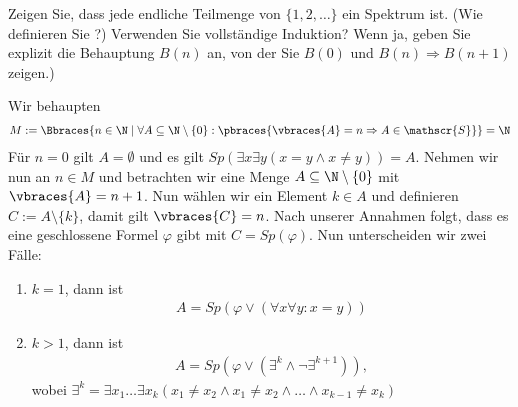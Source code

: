 
\begin{exercise}[71]

\phantom{}
	Zeigen Sie, dass jede endliche Teilmenge von  $\{1,2, \dots \}$ ein Spektrum ist. (Wie definieren Sie ?) Verwenden Sie vollständige Induktion? Wenn ja, geben Sie explizit die Behauptung $B(n)$ an, von der Sie $B(0)$ und $B(n) \Rightarrow B(n + 1)$ zeigen.)

\end{exercise}


\begin{solution}

\phantom{}
	Wir behaupten
	\begin{align*}
	M := \Bbraces{n \in \N \mid \forall A \subseteq \N \setminus \{0\}: \pbraces{\vbraces{A} = n \Rightarrow  A \in \mathscr{S}}} = \N
	\end{align*}
	Für $n = 0$ gilt $A = \emptyset$ und es gilt $Sp(\exists x \exists y(x = y \land x \neq y)) = A$. \newline
	Nehmen wir nun an $n \in M$ und betrachten wir eine Menge $A \subseteq \N \setminus \{0\}$ mit $\vbraces{A} = n + 1$. Nun wählen wir ein Element $k \in A$ und definieren $C := A \setminus \{k\}$, damit gilt $\vbraces{C} = n$. Nach unserer Annahmen folgt, dass es eine geschlossene Formel $\varphi$ gibt mit $C = Sp(\varphi)$. Nun unterscheiden wir zwei Fälle:
	\begin{enumerate}[label = Fall \arabic*:]
		\item $k = 1$, dann ist
			\begin{align*}
			A = Sp(\varphi \lor (\forall x \forall y: x = y))
			\end{align*}
		\item $k > 1$, dann ist
			\begin{align*}
			A = Sp(\varphi \lor (\exists^k \land \neg \exists^{k + 1})),
			\end{align*}
			wobei $\exists^k = \exists x_1 \dots \exists x_k (x_1 \neq x_2 \land x_1 \neq x_2 \land \dots \land x_{k - 1} \neq x_k)$
	\end{enumerate}
\end{solution}
